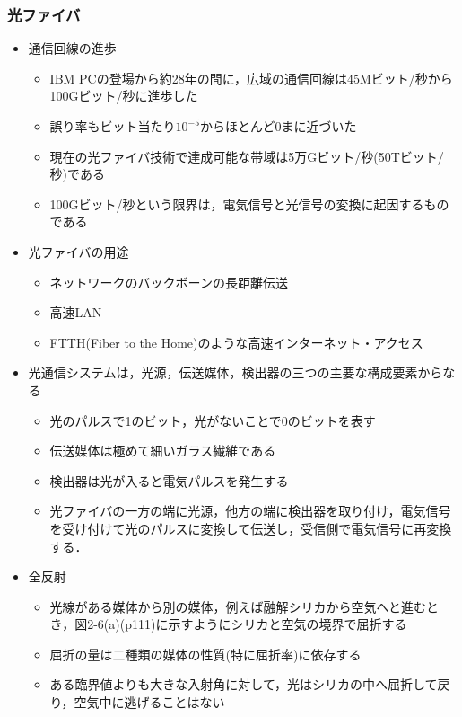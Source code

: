 \documentclass[a4paper]{ltjsarticle}
\begin{document}
		\subsubsection{光ファイバ}
			\begin{itemize}
				\item 通信回線の進歩
				\begin{itemize}
					\item IBM PCの登場から約28年の間に，広域の通信回線は45Mビット/秒から100Gビット/秒に進歩した
					\item 誤り率もビット当たり$10^{-5}$からほとんど0まに近づいた
					\item 現在の光ファイバ技術で達成可能な帯域は5万Gビット/秒(50Tビット/秒)である
					\item 100Gビット/秒という限界は，電気信号と光信号の変換に起因するものである
				\end{itemize}
				\item 光ファイバの用途
				\begin{itemize}
					\item ネットワークのバックボーンの長距離伝送
					\item 高速LAN
					\item FTTH(Fiber to the Home)のような高速インターネット・アクセス
				\end{itemize}
				\item 光通信システムは，光源，伝送媒体，検出器の三つの主要な構成要素からなる
				\begin{itemize}
					\item 光のパルスで1のビット，光がないことで0のビットを表す
					\item 伝送媒体は極めて細いガラス繊維である
					\item 検出器は光が入ると電気パルスを発生する
					\item 光ファイバの一方の端に光源，他方の端に検出器を取り付け，電気信号を受け付けて光のパルスに変換して伝送し，受信側で電気信号に再変換する．
				\end{itemize}
				\item 全反射
				\begin{itemize}
					\item 光線がある媒体から別の媒体，例えば融解シリカから空気へと進むとき，図2-6(a)(p111)に示すようにシリカと空気の境界で屈折する
					\item 屈折の量は二種類の媒体の性質(特に屈折率)に依存する
					\item ある臨界値よりも大きな入射角に対して，光はシリカの中へ屈折して戻り，空気中に逃げることはない

\end{itemize}
\end{itemize}
\end{document}
